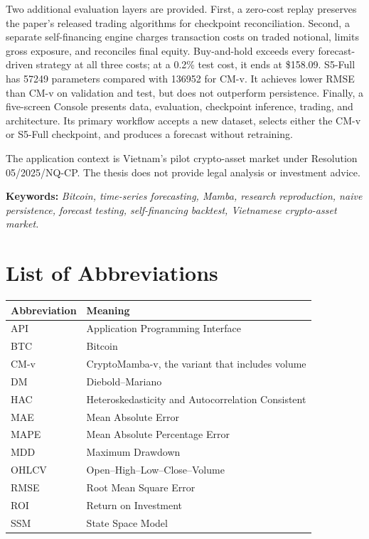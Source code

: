 \documentclass[13pt,a4paper,oneside]{report}
\begin{document}
Two additional evaluation layers are provided. First, a zero-cost replay preserves the paper's
released trading algorithms for checkpoint reconciliation. Second, a separate self-financing
engine charges transaction costs on traded notional, limits gross exposure, and reconciles final
equity. Buy-and-hold exceeds every forecast-driven strategy at all three costs; at a \num{0.2}\%
test cost, it ends at \$\num{158.09}. S5-Full has \num{57249} parameters compared with
\num{136952} for CM-v.
It achieves lower RMSE than CM-v on validation and test, but does not outperform persistence.
Finally, a five-screen Console presents data, evaluation, checkpoint inference, trading, and
architecture. Its primary workflow accepts a new dataset, selects either the CM-v or S5-Full
checkpoint, and produces a forecast without retraining.

The application context is Vietnam's pilot crypto-asset market under Resolution
05/2025/NQ-CP. The thesis does not provide legal analysis or investment advice.

\vspace{6pt}
\noindent\textbf{Keywords:} \textit{Bitcoin, time-series forecasting, Mamba, research
reproduction, naive persistence, forecast testing, self-financing backtest, Vietnamese crypto-asset
market.}

\tableofcontents
\listoffigures
{}
\listoftables
{}

\chapter*{List of Abbreviations}
\renewcommand{\arraystretch}{1.22}
\begin{tabularx}{\linewidth}{@{}lX@{}}
\toprule
\textbf{Abbreviation} & \textbf{Meaning} \\
\midrule
API & Application Programming Interface \\
BTC & Bitcoin \\
CM-v & CryptoMamba-v, the variant that includes volume \\
DM & Diebold--Mariano \\
HAC & Heteroskedasticity and Autocorrelation Consistent \\
MAE & Mean Absolute Error \\
MAPE & Mean Absolute Percentage Error \\
MDD & Maximum Drawdown \\
OHLCV & Open--High--Low--Close--Volume \\
RMSE & Root Mean Square Error \\
ROI & Return on Investment \\
SSM & State Space Model \\
\bottomrule
\end{tabularx}
\renewcommand{\arraystretch}{1.0}
\end{document}
